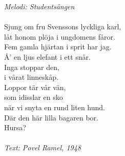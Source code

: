 {\footnotesize\textit{Melodi: Studentsången}}\\
\\
Sjung om fru Svenssons lyckliga karl,\\
låt honom plöja i ungdomens fåror.\\
Fem gamla hjärtan i sprit har jag.\\
Å' en ljus elefant i ett snår.\\
Inga stoppar den,\\
i vårat linneskåp.\\
Loppor tär vår vän,\\
som idisslar en sko\\
när vi snyta en rund liten hund.\\
\revrpt Där den här lilla bagaren bor.\rpt\\
Hursa?\\
\\
{\footnotesize\textit{Text: Povel Ramel, 1948}}
